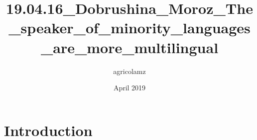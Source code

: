 \documentclass{article}
\title{19.04.16_Dobrushina_Moroz_The_speaker_of_minority_languages_are_more_multilingual}
\author{agricolamz }
\date{April 2019}
\begin{document}
\maketitle

\section{Introduction}
\end{document}

